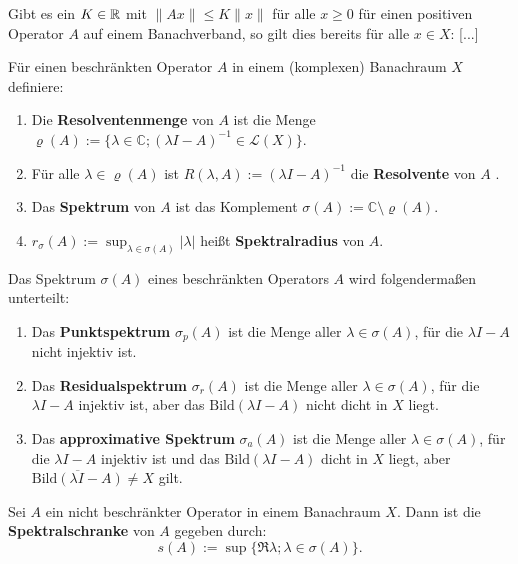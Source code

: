 \begin{bem}
Gibt es ein $K\in \mathbb{R}$ mit $\|Ax\|\leq K\|x\|$ für alle $x\geq0$ für einen positiven Operator $A$ auf einem Banachverband, so gilt dies bereits für alle $x\in X$: [...]
\end{bem}




\begin{defi} Für einen beschränkten Operator $A$ in einem (komplexen) Banachraum $X$ definiere:
\begin{enumerate}
\item Die \textbf{Resolventenmenge}  von $A$ ist die Menge $\varrho(A):=\{\lambda \in\mathbb C; (\lambda I-A)^{-1}\in \mathcal L(X)\}$.
\item  Für alle $\lambda\in\varrho(A)$  ist $R(\lambda, A):=(\lambda I-A)^{-1}$ die \textbf{Resolvente}  von $A$ . 
\item Das \textbf{Spektrum} von $A$ ist das Komplement $\sigma(A):=\mathbb C\setminus \varrho(A)$.
\item $r_\sigma (A):=\sup_{\lambda\in \sigma(A)} |\lambda |$ heißt \textbf{Spektralradius} von $A$.
\end{enumerate}
\end{defi}

\begin{bem}
Das Spektrum $\sigma(A)$ eines beschränkten Operators $A$ wird folgendermaßen unterteilt:
\begin{enumerate}
\item Das \textbf{Punktspektrum} $\sigma_p(A)$ ist die Menge aller $\lambda\in\sigma(A)$, für die $\lambda I-A$ nicht injektiv ist.
\item Das \textbf{Residualspektrum} $\sigma_r(A)$ ist die Menge aller $\lambda\in\sigma(A)$, für die $\lambda I-A$ injektiv ist, aber das $\text{Bild}(\lambda I-A)$ nicht dicht in $X$ liegt.
\item Das \textbf{approximative Spektrum} $\sigma_a(A)$ ist die Menge aller $\lambda\in\sigma (A)$, für die $\lambda I-A$ injektiv ist und das $\text{Bild}(\lambda I-A)$ dicht in $X$ liegt, aber $\overline{\text{Bild}(\lambda I-A)}\neq X$ gilt.
\end{enumerate}
\end{bem}

\begin{defi}
Sei $A$ ein nicht beschränkter Operator in einem Banachraum $X$. Dann ist die  \textbf{Spektralschranke} von $A$ gegeben durch:
\begin{equation*}
s(A):=\sup\{\mathfrak R\lambda; \lambda\in\sigma(A)\}.
\end{equation*}
\end{defi}

